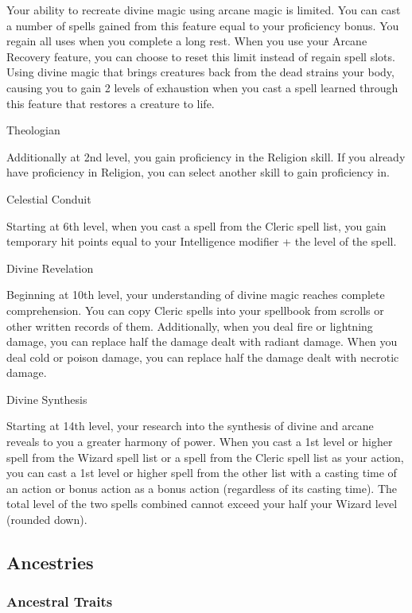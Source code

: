 Your ability to recreate divine magic using arcane magic is limited. You
can cast a number of spells gained from this feature equal to your
proficiency bonus. You regain all uses when you complete a long rest.
When you use your Arcane Recovery feature, you can choose to reset this
limit instead of regain spell slots. Using divine magic that brings
creatures back from the dead strains your body, causing you to gain 2
levels of exhaustion when you cast a spell learned through this feature
that restores a creature to life.

Theologian

Additionally at 2nd level, you gain proficiency in the Religion skill.
If you already have proficiency in Religion, you can select another
skill to gain proficiency in.

Celestial Conduit

Starting at 6th level, when you cast a spell from the Cleric spell list,
you gain temporary hit points equal to your Intelligence modifier + the
level of the spell.

Divine Revelation

Beginning at 10th level, your understanding of divine magic reaches
complete comprehension. You can copy Cleric spells into your spellbook
from scrolls or other written records of them. Additionally, when you
deal fire or lightning damage, you can replace half the damage dealt
with radiant damage. When you deal cold or poison damage, you can
replace half the damage dealt with necrotic damage.

Divine Synthesis

Starting at 14th level, your research into the synthesis of divine and
arcane reveals to you a greater harmony of power. When you cast a 1st
level or higher spell from the Wizard spell list or a spell from the
Cleric spell list as your action, you can cast a 1st level or higher
spell from the other list with a casting time of an action or bonus
action as a bonus action (regardless of its casting time). The total
level of the two spells combined cannot exceed your half your Wizard
level (rounded down).

\subsection{Ancestries}\label{ancestries}

\subsubsection{Ancestral Traits}\label{_ancestral_traits}

